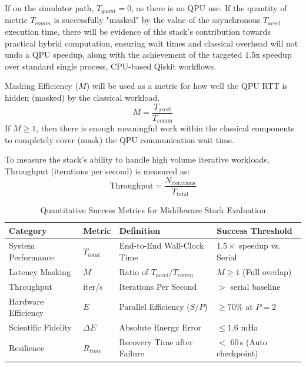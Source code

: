 \noindent If on the simulator path, $T_{quant} = 0$, as there is no QPU use. If the quantity of metric $T_{comm}$ is successfully "masked" by the value of the asynchronous $T_{accel}$ 
execution time, there will be evidence of this stack's contribution towards practical hybrid computation, ensuring wait times and classical overhead will not undo a QPU speedup, along with the achievement of the targeted 1.5x speedup over standard single process, CPU-based Qiskit workflows.   

\noindent Masking Efficiency ($M$) will be used as a metric for how well the QPU RTT is hidden (masked) by the classical workload. 
\begin{equation}
    M= \frac{T_{\text{accel}}}{T_{\text{comm}}}
\end{equation}
If $M \ge 1$, then there is enough meaningful work within the classical components to completely cover (mask) the QPU communication wait time. 

\noindent To measure the stack's ability to handle high volume iterative workloads, Throughput (iterations per second) is measured as:
\begin{equation}
        \text{Throughput} = \frac{N_{\text{iterations}}}{T_{\text{total}}}
\end{equation}

\begin{table}[htbp]
\centering
\renewcommand{\arraystretch}{1.2}
\small
\begin{tabular}{|>{\raggedright\arraybackslash}p{2.8cm}|>{\raggedright\arraybackslash}p{1.2cm}|>{\raggedright\arraybackslash}p{3.8cm}|>{\raggedright\arraybackslash}p{3.2cm}|}
\hline
\textbf{Category} & \textbf{Metric} & \textbf{Definition} & \textbf{Success Threshold} \\ \hline
System Performance & $T_{total}$ & End-to-End Wall-Clock Time & $1.5\times$ speedup vs. Serial \\ \hline
Latency Masking & $M$ & Ratio of $T_{accel} / T_{comm}$ & $M \geq 1$ (Full overlap) \\ \hline
Throughput & iter/s & Iterations Per Second & $>$ serial baseline \\ \hline
Hardware Efficiency & $E$ & Parallel Efficiency ($S/P$) & $\geq 70\%$ at $P=2$ \\ \hline
Scientific Fidelity & $\Delta E$ & Absolute Energy Error & $\leq 1.6$ mHa \\ \hline
Resilience & $R_{time}$ & Recovery Time after Failure & $<$ 60\,s (Auto checkpoint) \\ \hline
\end{tabular}
\normalsize
\caption{Quantitative Success Metrics for Middleware Stack Evaluation}
\label{table:success_metrics}
\end{table}


